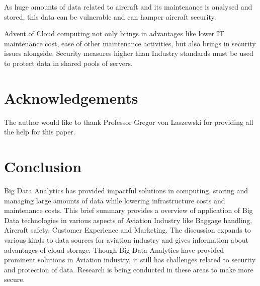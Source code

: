 \documentclass[sigconf]{acmart}
\begin{document}
As huge amounts of data related to aircraft and its maintenance is analysed and stored, this data can be vulnerable and can hamper aircraft security.

Advent of Cloud computing not only brings in advantages like lower IT maintenance cost, ease of other maintenance activities, but also brings in security issues alongside. Security measures higher than Industry standards must be used to protect data in shared pools of servers.

\section{Acknowledgements}

The author would like to thank Professor Gregor von Laszewski for providing all the help for this paper.

\section{Conclusion}

Big Data Analytics has provided impactful solutions in computing, storing and managing large amounts of data while lowering infrastructure costs and maintenance costs. This brief summary provides a overview of application of Big Data technologies in various aspects of Aviation Industry like Baggage handling, Aircraft safety, Customer Experience and Marketing. The discussion expands to various kinds to data sources for aviation industry and gives information about advantages of cloud storage. Though Big Data Analytics have provided prominent solutions in Aviation industry, it still has challenges related to security and protection of data. Research is being conducted in these areas to make more secure.



 
\end{document}
